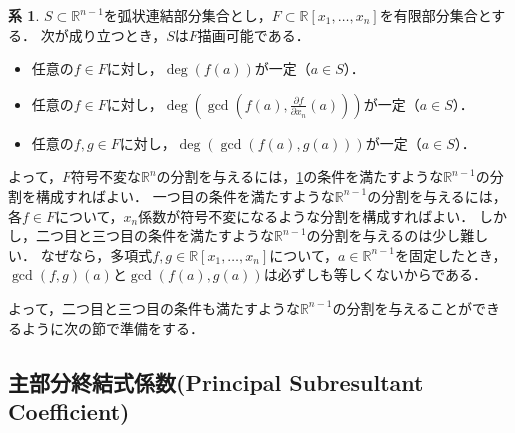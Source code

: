 \documentclass[uplatex, dvipdfmx]{jsarticle}
\newcommand{\R}{\mathbb{R}}
\theoremstyle{definition}
\newtheorem{corollary}{系}[section]
\begin{document}
\begin{corollary}\label{corollary:del}
$S \subset \R^{n-1}$を弧状連結部分集合とし，$F \subset \R[x_1,\dots, x_n]$を有限部分集合とする．
次が成り立つとき，$S$は$F$描画可能である．
\begin{itemize}
\item 任意の$f \in F$に対し，$\deg(f(a))$が一定（$a \in S$）．
\item 任意の$f \in F$に対し，$\deg(\gcd(f(a), \frac{\partial f}{\partial x_n}(a)))$が一定（$a \in S$）．
\item 任意の$f, g \in F$に対し，$\deg(\gcd(f(a), g(a)))$が一定（$a \in S$）．
\end{itemize}
\end{corollary}

よって，$F$符号不変な$\R^n$の分割を与えるには，\cref{corollary:del}の条件を満たすような$\R^{n-1}$の分割を構成すればよい．
一つ目の条件を満たすような$\R^{n-1}$の分割を与えるには，各$f \in F$について，$x_n$係数が符号不変になるような分割を構成すればよい．
しかし，二つ目と三つ目の条件を満たすような$\R^{n-1}$の分割を与えるのは少し難しい．
なぜなら，多項式$f, g \in \R[x_1, \dots, x_n]$について，$a \in \R^{n-1}$を固定したとき，$\gcd(f,g)(a)$と$\gcd(f(a),g(a))$は必ずしも等しくないからである．

よって，二つ目と三つ目の条件も満たすような$\R^{n-1}$の分割を与えることができるように次の節で準備をする．



\subsection{主部分終結式係数(Principal Subresultant Coefficient)}
\end{document}
